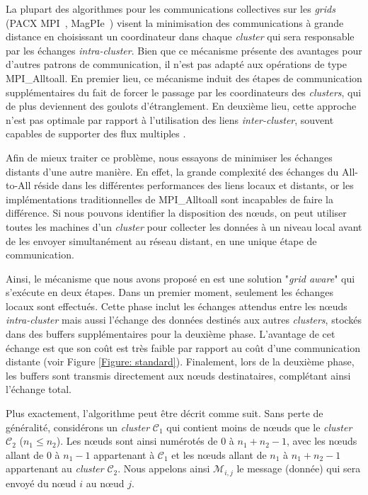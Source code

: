 La plupart des algorithmes pour les communications collectives sur les \textit{grids} (PACX MPI~\cite{Gabriel98}, MagPIe~\cite{Kielmann01}) visent la minimisation des communications à grande distance en choisissant un coordinateur dans chaque \textit{cluster} qui sera responsable par les échanges \textit{intra-cluster}. Bien que ce mécanisme présente des avantages pour d'autres patrons de communication, il n'est pas adapté aux opérations de type  MPI\_Alltoall. En premier lieu, ce mécanisme  induit des étapes de communication supplémentaires du fait de forcer le passage par les coordinateurs des \textit{clusters}, qui de plus deviennent des goulots d'étranglement. En deuxième lieu, cette approche n'est pas optimale par rapport à l'utilisation des liens \textit{inter-cluster}, souvent capables de supporter des flux multiples \cite{Casanova05}. 

Afin de mieux traiter ce problème, nous essayons de minimiser les échanges distants d'une autre manière. En effet, la grande complexité des échanges du All-to-All réside dans les différentes performances des liens locaux et distants, or les implémentations traditionnelles de MPI\_Alltoall sont incapables de faire la différence. Si nous pouvons identifier la disposition des n{\oe}uds, on peut utiliser toutes les machines d'un \textit{cluster} pour collecter les données à un niveau local avant de les envoyer simultanément au réseau distant, en une unique étape de communication. 

Ainsi, le mécanisme que nous avons proposé en \cite{Steffenel07c} est une solution "\textit{grid aware}" qui s'exécute en deux étapes. Dans un premier moment, seulement les échanges locaux sont effectués. Cette phase inclut les échanges attendus entre les n{\oe}uds \textit{intra-cluster} mais aussi l'échange des données destinés aux autres \textit{clusters}, stockés dans des buffers supplémentaires pour la deuxième phase. L'avantage de cet échange est que son coût est très faible par rapport au coût d'une communication distante (voir Figure \ref{Figure: standard}). Finalement, lors de la deuxième phase, les buffers sont transmis directement aux n{\oe}uds destinataires, complétant ainsi l'échange total.  

Plus exactement, l'algorithme peut être décrit comme suit. Sans perte de généralité, considérons un \textit{cluster}  ${\mathcal C}_1$ qui contient moins de n{\oe}uds que le \textit{cluster} ${\mathcal C}_2$ ($n_1\leq n_2$). Les n{\oe}uds sont ainsi numérotés de 0 à $n_1+n_2-1$, avec les n{\oe}uds allant de 0 à $n_1-1$ appartenant à ${\mathcal C}_1$ et les n{\oe}uds allant de $n_1$ à $n_1+n_2-1$ appartenant au \textit{cluster} ${\mathcal C}_2$. Nous appelons ainsi ${\mathcal M}_{i,j}$ le message (donnée) qui sera envoyé du n{\oe}ud $i$ au n{\oe}ud $j$. 


